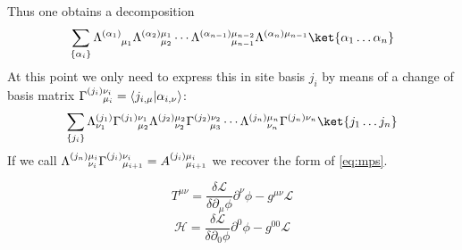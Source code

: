 \documentclass{report}
\begin{document}
Thus one obtains a decomposition 
\begin{equation*}
	\sum_{\left\{\alpha_i\right\}} 
		\Lambda^{(\alpha_1) }_{\hphantom{(\alpha_1)} \mu_1}
		\Lambda^{(\alpha_2) \mu_1}_{\hphantom{(\alpha_1)} \mu_2}
		\cdots 
		\Lambda^{(\alpha_{n-1}) \mu_{n-2}}_{\hphantom{(\alpha_{n-1})} \mu_{n-1}}
		\Lambda^{(\alpha_n) \mu_{n-1}}_{\hphantom{(\alpha)} }
		\ket{\alpha_1 \dots\alpha_n}
\end{equation*}
At this point we only need to express this in site basis $ j_i $ by means 
of a change of basis matrix $ \Gamma^{(j_i) \nu_{i}}_{\hphantom{(j_i)} \mu_i} 
= \langle j_{i, \mu} \vert \alpha_{i,\nu} \rangle$: 
\begin{equation*}
	\sum_{\left\{ j_i \right\}}
		\Lambda^{(j_1)}_{\nu_1} \Gamma^{(j_1)\nu_1}_{\hphantom{(j_1)} \mu_2}
		\Lambda^{(j_2)\mu_2}_{\hphantom{(j_2)}\nu_2} \Gamma^{(j_2)\nu_2}_{\hphantom{(j_i)} \mu_3}
		\cdots 
		\Lambda^{(j_n)\mu_n}_{\hphantom{(j_n)}\nu_n} \Gamma^{(j_n)\nu_n}_{\hphantom{(j_i)} }
		\ket{j_1\dots j_n}
\end{equation*}
If we call $ \Lambda^{(j_n) \mu_i}_{\hphantom{(j_n)}\nu_i}\Gamma^{(j_i) 
\nu_{i}}_{\hphantom{(j_i)} \mu_{i+1}} = A^{(j_i)\mu_i}_{\hphantom{(j_i)} \mu_{i+1}}$ 
we recover the form of \cref{eq:mps}. 
	

\begin{equation*}
	T^{\mu\nu} = \frac{\delta \mathcal{L}}{\delta \partial_\mu \phi}
		\partial^\nu \phi - g^{\mu\nu}\mathcal{L}
\end{equation*}
\begin{equation*}
	\mathcal{H}
		= \frac{\delta \mathcal{L}}{\delta \partial_0 \phi}	
			\partial^0 \phi
			- g^{00} \mathcal{L}
\end{equation*}
\end{document}
